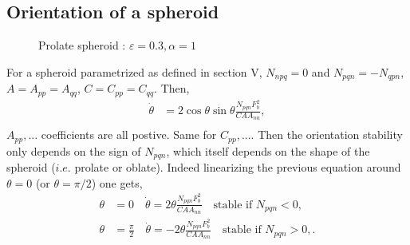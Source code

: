 \documentclass[12pt]{My_preprint}
\begin{document}
\subsection{Orientation of a spheroid}

\begin{figure}
    \centering
{}
    \caption{Prolate spheroid : $\varepsilon = 0.3, \alpha = 1$}
\end{figure}

For a spheroid parametrized as defined in section V,  $N_{npq} = 0$  and $N_{pqn} = - N_{qpn}$, $A = A_{pp} =A_{qq}$, $C = C_{pp} =C_{qq}$. 
Then, 
\begin{align}
    \dot \theta  &= 2\cos \theta \sin \theta \frac{N_{pqn}F_b^2}{CA A_{nn}}, \\
\end{align}
$A_{pp}, ...$ coefficients are all postive. Same for $C_{pp}, ...$. 
Then the orientation stability only depends on the sign of $N_{pqn}$, which itself depends on the shape of the spheroid ($i.e.$ prolate or oblate).
Indeed linearizing the previous equation around $\theta =0$ (or $\theta =\pi/2$) one gets,
\begin{align}
 \theta &= 0 \quad   \dot \theta  =  2\theta \frac{N_{pqn}F_b^2}{CA A_{nn}} \quad \text{stable if $N_{pqn}< 0$}, \\
 \theta &= \frac{\pi}{2} \quad   \dot \theta  =  -2\theta \frac{N_{pqn}F_b^2}{CA A_{nn}} \quad \text{stable if $N_{pqn}> 0$},.
\end{align}
\end{document}
